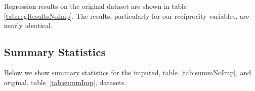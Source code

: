 
\FloatBarrier

Regression results on the original dataset are shown in table \ref{tab:regResultsNoImp}. The results, particularly for our reciprocity variables, are nearly identical. 

\newpage

\subsection*{Summary Statistics}
\label{appSumm}

Below we show summary statistics for the imputed, table~\ref{tab:summNoImp}, and original, table~\ref{tab:summImp}, datasets.


\FloatBarrier


\FloatBarrier

\newpage
